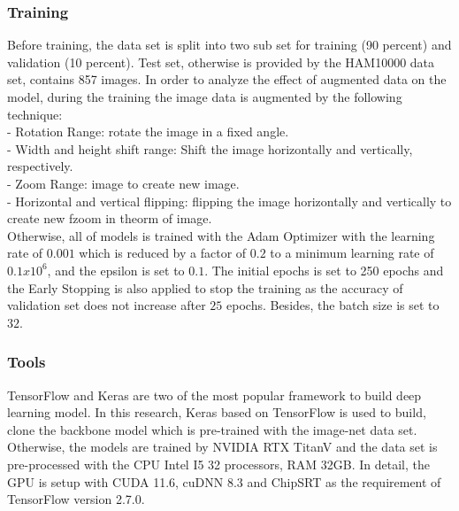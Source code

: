 \documentclass[sensors,article,submit,pdftex,moreauthors]{Definitions/mdpi}
\begin{document}
\subsubsection{Training}
Before training, the data set is split into two sub set for training (90 percent) and validation (10 percent). Test set, otherwise is provided by the HAM10000 data set, contains 857 images. In order to analyze the effect of augmented data on the model, during the training the image data is augmented by the following technique:\\
- Rotation Range: rotate the image in a fixed angle. \\
- Width and height shift range: Shift the image horizontally and vertically, respectively. \\
- Zoom Range:  image to create new image. \\
- Horizontal and vertical flipping: flipping the image horizontally and vertically to create new fzoom in theorm of image.\\
Otherwise, all of models is trained with the Adam Optimizer \cite{6980} with the learning rate of $0.001$ which is reduced by a factor of $0.2$ to a minimum learning rate of $0.1 x 10^6$, and the epsilon is set to $0.1$. The initial epochs is set to 250 epochs and the Early Stopping is also applied to stop the training as the accuracy of validation set does not increase after $25$ epochs. Besides, the batch size is set to $32$.

\subsubsection{Tools}
TensorFlow and Keras are two of the most popular framework to build deep learning model. In this research, Keras based on TensorFlow is used to build, clone the backbone model which is pre-trained with the image-net data set. Otherwise, the models are trained by NVIDIA RTX TitanV and the data set is pre-processed with the CPU Intel I5 32 processors, RAM 32GB. In detail, the GPU is setup with CUDA 11.6, cuDNN 8.3 and ChipSRT as the requirement of TensorFlow version 2.7.0.
\end{document}
